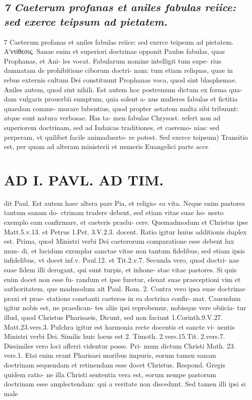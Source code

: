 \documentclass{article}
\begin{document}
\begin{pages}
\subsection*{\textit{7 Caeterum profanas et aniles fabulas reiice: sed exerce teipsum ad pietatem.}}7 Caeterum profanas et aniles fabulas reiice: sed exerce teipsum ad pietatem. Αʹντίθεσις. Sanae enim et superiori doctrinae opponit Paulus fabulas, quas Prophanas, et Ani- les vocat. Fabularum nomine intelligit tum supe- rius damnatam de prohibitione ciborum doctri- nam: tum etiam reliquas, quae in rebus externis cultum Dei constituunt Prophanas voca, quod sint blasphemae. Aniles autem, quod sint nihili. Est autem hoc postremum dictum ex forma qua- dam vulgaris prouerbii sumptum, quia solent a- nus mulieres fabulas et fictitia quaedam comme- morare lubentius, quod propter aetatem multa sibi tribuunt: atque sunt natura verbosae. Has ta- men fabulas Chrysost. refert non ad superiorem doctrinam, sed ad Iudaicas traditiones, et caeremo- nias: sed perperam, vt quilibet facile animaduerte- re potest. Sed exerce teipsum) Transitio est, per quam ad alteram ministerii et muneris Euangelici parte acce  \pend
\section*{AD I. PAVL. AD TIM. }
\marginpar{[ p.204 ]}\pstart dit Paul. Est autem haec altera pars Pia, et religio- sa vita. Neque enim pastores tantum sanam do- ctrinam tradere debent, sed etiam vitae suae ho- nesto exemplo eam confirmare, et caeteris praelu- cere. Quemadmodum et Christus ipse Matt.5.v.13. et Petrus 1.Pet. 3.V.2.3. docent. Ratio igitur huius additionis duplex est. Prima, quod Ministri verbi Dei caeterorum comparatione esse debent lux mun- di, et lucidum exemplar sanctae vitae non tantum fidelibus, sed etiam ipsis infidelibus, vt docet inf.v. Paul.12. et Tit.2.v.7. Secunda vero, quod doctri- nae suae fidem illi derogant, qui sunt turpis, et inhone- stae vitae pastores. Si quis enim docet non esse fu- randum et ipse furetur, eleuat suae praeceptioni vim et authoritatem, que madmodum ait Paul. Rom. 2. Contra vero ipsa suae doctrinae praxi et prae- statione constanti caeteros in ea doctrina confir- mat. Cauendum igitur nobis est, ne praedican- tes aliis ipsi reprobemur, nobisque vere obiicia- tur illud, quod Christus Pharisaeis, Dicunt, sed non faciunt 1.Corinth.9.V.27. Matt.23.vers.3. Pulchra igitur est harmonia recte docentis et sancte vi- uentis Ministri verbi Dei. Similis huic loeus est 2. Timoth. 2.vers.15.Tit. 2.vers.7. Dissimiles vero loci afferri videntur posse. Pri- mum dictum Christi Math. 23. vers.1. Etsi enim erant Pharisaei moribus impuris, eorum tamen sanam doctrinam sequendam et retinendam esse docet Christus. Respond. Gregis quidem ratio- ne illa Christi sententia vera est, eorum nempe pastorum doctrinam esse amplectendam: qui a veritate non discedunt. Sed tamen illi ipsi si male  \pend

\end{pages}
\end{document}
